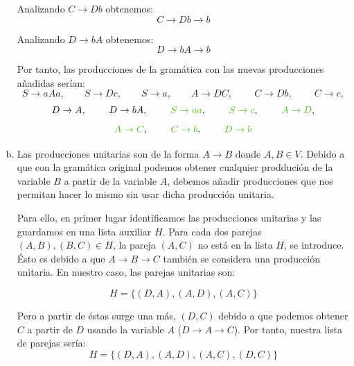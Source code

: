 \documentclass[10pt,a4paper,spanish]{report}
\begin{document}
\begin{enumerate}[a)]
Analizando $C \rightarrow Db$ obtenemos:
\begin{displaymath}
C \rightarrow Db \rightarrow b
\end{displaymath}

Analizando $D \rightarrow bA$ obtenemos:
\begin{displaymath}
  D \rightarrow bA \rightarrow b
\end{displaymath}

Por tanto, las producciones de la gramática con las nuevas producciones añadidas serían:
\begin{displaymath}
S \rightarrow aAa, \qquad S \rightarrow Dc, \qquad S \rightarrow a, \qquad A \rightarrow DC, \qquad\ C \rightarrow Db, \qquad\ C \rightarrow c,
\end{displaymath}
\begin{displaymath}
D \rightarrow A, \qquad\ D \rightarrow bA, \qquad\ \textcolor{p9}{S \rightarrow aa}, \qquad\ \textcolor{p9}{S \rightarrow c}, \qquad\ \textcolor{p9}{A \rightarrow D}, 
\end{displaymath}
\begin{displaymath}
\textcolor{p9}{A \rightarrow C}, \qquad\ \textcolor{p9}{C \rightarrow b}, \qquad\ \textcolor{p9}{D \rightarrow b}
\end{displaymath}

\item Las producciones unitarias son de la forma $A \rightarrow B$ donde $A, B \in V$. Debido a que con la gramática original podemos obtener cualquier proddución de la variable $B$ a partir de la variable $A$, debemos añadir producciones que nos permitan hacer lo mismo sin usar dicha producción unitaria.

Para ello, en primer lugar identificamos las producciones unitarias y las guardamos en una lista auxiliar $H$. Para cada dos parejas $(A,B),(B,C) \in H$, la pareja $(A,C)$ no está en la lista $H$, se introduce. Ésto es debido a que $A \rightarrow B \rightarrow C$ también se considera una producción unitaria. En nuestro caso, las parejas unitarias son:

\begin{displaymath}
H = \{(D,A),(A,D),(A,C)\}
\end{displaymath}

Pero a partir de éstas surge una más, $(D,C)$ debido a que podemos obtener $C$ a partir de $D$ usando la variable $A$ ($D \rightarrow A \rightarrow C$). Por tanto, nuestra lista de parejas sería:
\begin{displaymath}
H = \{(D,A),(A,D),(A,C), (D,C)\}
\end{displaymath}


\end{enumerate}
\end{document}

